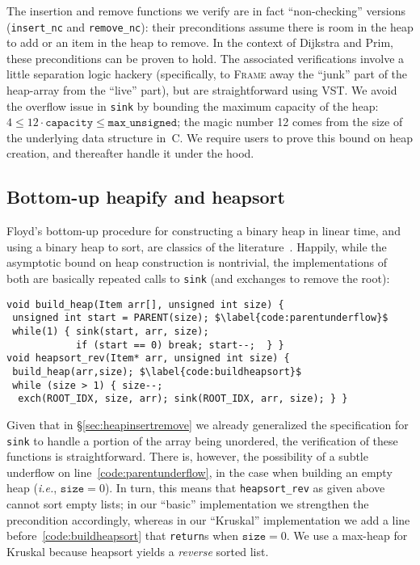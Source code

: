 The insertion and remove functions we verify are in fact ``non-checking'' versions (\texttt{insert\_nc} and \texttt{remove\_nc}): their preconditions assume there is room in the heap to add or an item in the heap to remove.  In the context of Dijkstra and Prim, these preconditions can be proven to hold.  The associated verifications involve a little separation logic hackery (specifically, to \textsc{Frame} away the ``junk'' part of the heap-array from the ``live'' part), but are straightforward using VST.  We avoid the overflow issue in \texttt{sink} by bounding the maximum capacity of the heap: $4 \le 12\cdot\texttt{capacity} \leq \texttt{max\_unsigned}$; the magic number 12 comes from the size of the underlying data structure in~C.  We require users to prove this bound on heap creation, and thereafter handle it under the hood.

\lstset{style=myTinyStyle}

\subsection{Bottom-up heapify and heapsort}
\label{sec:heapsort}

Floyd's bottom-up procedure for constructing a binary heap in linear time, and using a binary heap to sort, are classics of the literature~\cite{clrs,sedgewick}.
Happily, while the asymptotic bound on heap construction is nontrivial, the implementations of both are basically repeated calls to \texttt{sink} (and exchanges to remove the root):
\begin{lstlisting}[firstnumber=19]
void build_heap(Item arr[], unsigned int size) {
 unsigned int start = PARENT(size); $\label{code:parentunderflow}$
 while(1) { sink(start, arr, size);
            if (start == 0) break; start--;  } }
void heapsort_rev(Item* arr, unsigned int size) {
 build_heap(arr,size); $\label{code:buildheapsort}$
 while (size > 1) { size--;
  exch(ROOT_IDX, size, arr); sink(ROOT_IDX, arr, size); } }
\end{lstlisting}
Given that in \S\ref{sec:heapinsertremove} we already generalized the specification for \texttt{sink} to handle a portion of the array being unordered, the verification of these functions is straightforward.  There is, however, the possibility of a subtle underflow on line~\ref{code:parentunderflow}, in the case when building an empty heap (\emph{i.e.}, $\texttt{size}=0$).  In turn, this means that \texttt{heapsort\_rev} as given above cannot sort empty lists; in our ``basic'' implementation we strengthen the precondition accordingly, whereas in our ``Kruskal'' implementation we add a line before~\ref{code:buildheapsort} that \texttt{return}s when $\texttt{size}=0$.  We use a max-heap for Kruskal because heapsort yields a \emph{reverse} sorted list.

